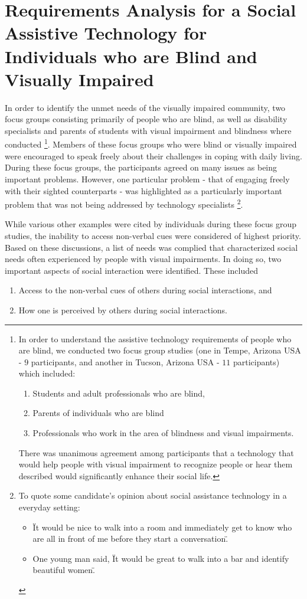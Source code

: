 \documentclass[oneside,11pt]{memoir}
\begin{document}
\section{Requirements Analysis for a Social Assistive Technology for Individuals who are Blind and Visually Impaired}
In order to identify the unmet needs of the visually impaired community, two focus groups consisting primarily of people who are blind, as well as disability specialists and parents of students with visual impairment and blindness where conducted \footnote{ In  order  to  understand  the  assistive  technology  requirements  of  people  who  are  blind, we conducted two focus group studies (one in Tempe, Arizona USA - $9$ participants, and another in Tucson, Arizona USA - $11$ participants) which included:
\begin{enumerate}[1.]
\item Students and adult professionals who are blind,
\item Parents of individuals who are blind
\item Professionals who work in the area of blindness and visual impairments.
\end{enumerate}
There was unanimous agreement among participants that a technology that would help people with visual impairment to recognize people or hear them described would significantly enhance their social life.}. Members of these focus groups who were blind or visually impaired were encouraged to speak freely about their challenges in coping with daily living. During these focus groups, the participants agreed on many issues as being important problems. However, one particular problem - that of engaging freely with their sighted counterparts - was highlighted as a particularly important problem that was not being addressed by technology specialists \footnote{  To quote some candidate's opinion about social assistance technology in a everyday setting:
\begin{itemize}
\item \"It would be nice to walk into a room and immediately get to know who are all in front of me before they start a conversation\".
\item One young man said, \"It would be great to walk into a bar and identify beautiful women\".
\end{itemize}}.

While various other examples were cited by individuals during these focus group studies, the inability to access non-verbal cues were considered of highest priority. Based on these discussions, a list of needs was complied that characterized social needs often experienced by people with visual impairments. In doing so, two important aspects of social interaction were identified. These included
\begin{enumerate}[1.]
\item Access to the non-verbal cues of others during social interactions, and
\item How one is perceived by others during social interactions.
\end{enumerate}
\end{document}
